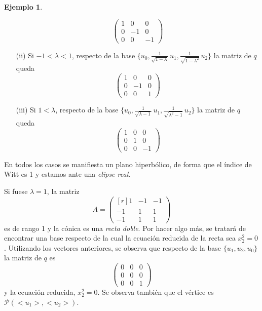 \documentclass[12pt]{report}
\theoremstyle{definition}
\theoremstyle{definition}
\newtheorem{example}{Ejemplo}[chapter]
\theoremstyle{remark}
\begin{document}
\begin{example}
\begin{itemize}
    \[\begin{pmatrix}
    1 & 0 & 0 \\
    0 & -1 & 0 \\
    0 & 0 & -1
    \end{pmatrix}\]
    \item[(ii)] Si $-1 < \lambda < 1$, respecto de la base $\{u_0,\frac{1}{\sqrt{1-\lambda}} \, u_1, \frac{1}{\sqrt{1-\lambda^2}} \, u_2 \}$ la matriz de $q$ queda
    \[\begin{pmatrix}
    1 & 0 & 0 \\
    0 & -1 & 0 \\
    0 & 0 & 1
    \end{pmatrix}\]
    \item[(iii)] Si $1 < \lambda$, respecto de la base $\{u_0,\frac{1}{\sqrt{\lambda-1}} \, u_1, \frac{1}{\sqrt{\lambda^2-1}} \, u_2 \}$ la matriz de $q$ queda
    \[\begin{pmatrix}
    1 & 0 & 0 \\
    0 & 1 & 0 \\
    0 & 0 & -1
    \end{pmatrix}\]
\end{itemize}
En todos los casos se manifiesta un plano hiperbólico, de forma que el índice de Witt es 1 y estamos ante una \textit{elipse real}.

\vspace{2mm}
\noindent
Si fuese $\lambda = 1$, la matriz
\[A = \begin{pmatrix*}[r]
    1 & -1 & -1 \\
    -1 & 1 & 1 \\
    -1 & 1 & 1
\end{pmatrix*}\]
es de rango 1 y la cónica es una \textit{recta doble}. Por hacer algo más, se tratará de encontrar una base respecto de la cual la ecuación reducida de la recta sea $x_2^2 = 0$. Utilizando los vectores anteriores, se observa que respecto de la base $\{u_1,u_2,u_0\}$ la matriz de $q$ es
\[\begin{pmatrix*}
    0 & 0 & 0 \\
    0 & 0 & 0 \\
    0 & 0 & 1
\end{pmatrix*}\]
y la ecuación reducida, $x_2^2 = 0$. Se observa también que el vértice es $\mathcal{P}(<u_1>,<u_2>)$.


\end{example}
\end{document}
